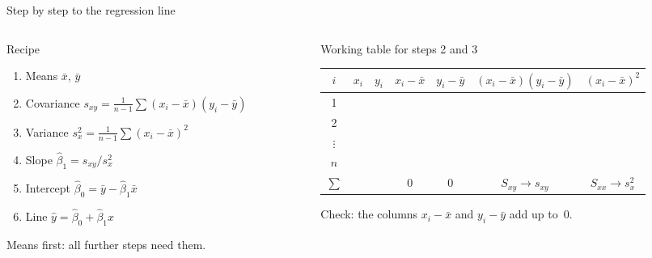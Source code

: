 \documentclass[aspectratio=169,11pt]{beamer}
\begin{document}
\begin{frame}{Step by step to the regression line}
  \begin{columns}[T]
    \begin{column}{0.4\textwidth}
      \begin{block}{Recipe}
        \small
        \begin{enumerate}
          \setlength{\itemsep}{1pt}
          \item Means $\bar{x}$, $\bar{y}$
          \item Covariance $s_{xy} = \frac{1}{n-1}\sum (x_i-\bar{x})(y_i-\bar{y})$
          \item Variance $s_x^{2} = \frac{1}{n-1}\sum (x_i-\bar{x})^{2}$
          \item Slope $\hat{\beta}_1 = s_{xy} / s_x^{2}$
          \item Intercept $\hat{\beta}_0 = \bar{y} - \hat{\beta}_1 \bar{x}$
          \item Line $\hat{y} = \hat{\beta}_0 + \hat{\beta}_1 x$
        \end{enumerate}
      \end{block}
      \footnotesize Means first: all further steps need them.
    \end{column}
    \begin{column}{0.58\textwidth}
      \begin{block}{Working table for steps 2 and 3}
        \begin{center}
          \scriptsize
          \renewcommand{\arraystretch}{1.2}
          \setlength{\tabcolsep}{3pt}
          \begin{tabular}{c|cc|cc|cc}
            \toprule
            $i$ & $x_i$ & $y_i$ & $x_i-\bar{x}$ & $y_i-\bar{y}$ & $(x_i-\bar{x})(y_i-\bar{y})$ & $(x_i-\bar{x})^{2}$ \\
            \midrule
            1 & & & & & & \\
            2 & & & & & & \\
            $\vdots$ & & & & & & \\
            $n$ & & & & & & \\
            \midrule
            $\sum$ & & & $0$ & $0$ & $S_{xy}\to s_{xy}$ & $S_{xx}\to s_x^{2}$ \\
            \bottomrule
          \end{tabular}
        \end{center}
        \small Check: the columns $x_i-\bar{x}$ and $y_i-\bar{y}$ add up
        to~$0$.
      \end{block}
    \end{column}
  \end{columns}
\end{frame}
\end{document}
